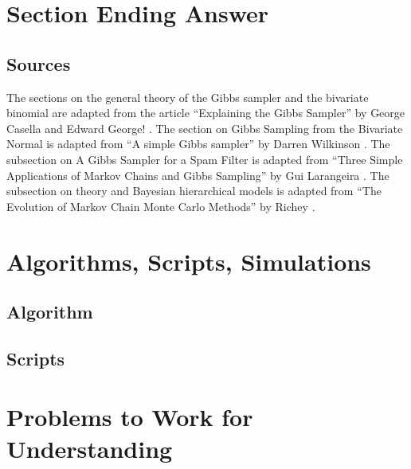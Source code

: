 \documentclass[12pt]{article}
\begin{document}
\section*{Section Ending Answer}

\subsection*{Sources} The sections on the general theory of the Gibbs
sampler and the bivariate binomial are adapted from the article
``Explaining the Gibbs Sampler'' by George Casella and Edward George!
\cite{casella92}.  The section on Gibbs Sampling from the Bivariate
Normal is adapted from ``A simple Gibbs sampler'' by Darren Wilkinson
\cite{wilkinson}. The subsection on A Gibbs Sampler for a Spam Filter is
adapted from ``Three Simple Applications of Markov Chains and Gibbs
Sampling'' by Gui Larangeira
\cite{larangeira}.  The subsection on theory and Bayesian hierarchical
models is adapted from ``The Evolution of Markov Chain Monte Carlo
Methods'' by Richey
\cite{richey10}.

\hr

\section*{Algorithms, Scripts, Simulations}

\subsection*{Algorithm}

\subsection*{Scripts}



\hr

\section*{Problems to Work for Understanding}

\renewcommand{\theexerciseseries}{}
\renewcommand{\theexercise}{\arabic{exercise}}
\end{document}
